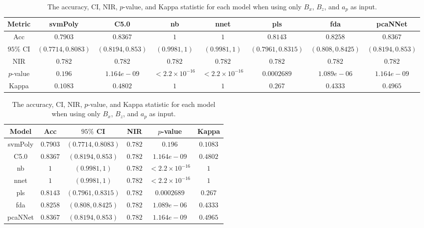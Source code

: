 \begin{table}[!ht]
	\centering
	\begin{tabular}{|c|c|c|c|c|c|c|c|}
		\hline
		Metric & svmPoly & C5.0 & nb & nnet & pls & fda & pcaNNet \\ \hline
		Acc & $0.7903$ & $0.8367$ & $1$ & $1$ & $0.8143$ & $0.8258$ & $0.8367$ \\ \hline
		$95\%$ CI & $(0.7714, 0.8083)$ & $(0.8194, 0.853)$ & $(0.9981, 1)$ & $(0.9981, 1)$ & $(0.7961, 0.8315)$ & $(0.808, 0.8425)$ & $(0.8194, 0.853)$ \\ \hline
		NIR & $0.782$ & $0.782$ & $0.782$ & $0.782$ & $0.782$ & $0.782$ & $0.782$ \\ \hline
		$p$-value & $0.196$ & $1.164e-09$ & $< 2.2 \times {10}^{-16}$ & $< 2.2 \times {10}^{-16}$ & $0.0002689$ & $1.089e-06$ & $1.164e-09$ \\ \hline
		Kappa & $0.1083$ & $0.4802$ & $1$ & $1$ & $0.267$ & $0.4333$ & $0.4965$ \\ \hline
	\end{tabular}
	\caption{The accuracy, CI, NIR, $p$-value, and Kappa statistic for each model when using only $B_{x}$, $B_{z}$, and $a_{p}$ as input.}
	\label{tab:stats:xzap}
\end{table}

\begin{table}[!ht]
	\centering
	\begin{tabular}{|c|c|c|c|c|c|}
		\hline
		Model & Acc & $95\%$ CI & NIR & $p$-value & Kappa \\ \hline
		svmPoly & $0.7903$ & $(0.7714, 0.8083)$ & $0.782$ & $0.196$ & $0.1083$ \\ \hline
		C5.0 & $0.8367$ & $(0.8194, 0.853)$ & $0.782$ & $1.164e-09$ & $0.4802$ \\ \hline
		nb & $1$ & $(0.9981, 1)$ & $0.782$ & $< 2.2 \times {10}^{-16}$ & $1$ \\ \hline
		nnet & $1$ & $(0.9981, 1)$ & $0.782$ & $< 2.2 \times {10}^{-16}$ & $1$ \\ \hline
		pls & $0.8143$ & $(0.7961, 0.8315)$ & $0.782$ & $0.0002689$ & $0.267$ \\ \hline
		fda & $0.8258$ & $(0.808, 0.8425)$ & $0.782$ & $1.089e-06$ & $0.4333$ \\ \hline
		pcaNNet & $0.8367$ & $(0.8194, 0.853)$ & $0.782$ & $1.164e-09$ & $0.4965$ \\ \hline
	\end{tabular}
	\caption{The accuracy, CI, NIR, $p$-value, and Kappa statistic for each model when using only $B_{x}$, $B_{z}$, and $a_{p}$ as input.}
	\label{tab:stats:reverse:xzap}
\end{table}

